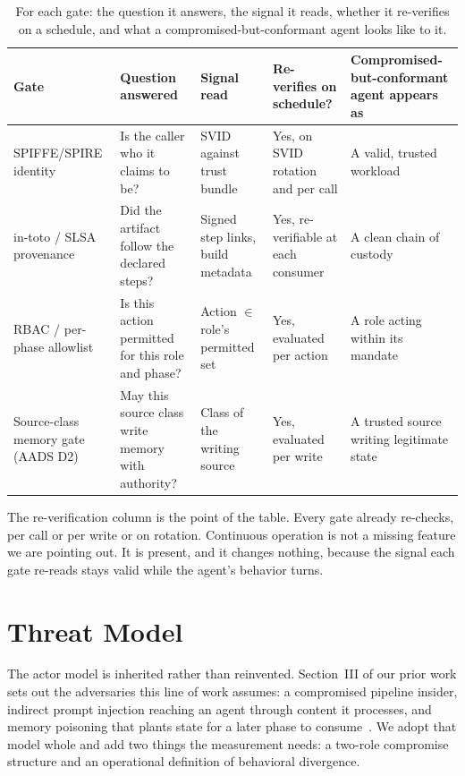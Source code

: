 \documentclass[conference]{IEEEtran}
\begin{document}
\begin{table}[t]
\caption{For each gate: the question it answers, the signal it reads, whether it re-verifies on a schedule, and what a compromised-but-conformant agent looks like to it.}
\label{tab:gates}
\centering
\renewcommand{\arraystretch}{1.15}
\footnotesize
\begin{tabularx}{\textwidth}{|L{2.6cm}|Y|Y|C{2.0cm}|Y|}
\hline
\textbf{Gate} & \textbf{Question answered} & \textbf{Signal read} & \textbf{Re-verifies on schedule?} & \textbf{Compromised-but-conformant agent appears as} \\
\hline
SPIFFE/SPIRE identity & Is the caller who it claims to be? & SVID against trust bundle & Yes, on SVID rotation and per call & A valid, trusted workload \\ \hline
in-toto / SLSA provenance & Did the artifact follow the declared steps? & Signed step links, build metadata & Yes, re-verifiable at each consumer & A clean chain of custody \\ \hline
RBAC / per-phase allowlist & Is this action permitted for this role and phase? & Action $\in$ role's permitted set & Yes, evaluated per action & A role acting within its mandate \\ \hline
Source-class memory gate (AADS D2) & May this source class write memory with authority? & Class of the writing source & Yes, evaluated per write & A trusted source writing legitimate state \\ \hline
\end{tabularx}
\end{table}

The re-verification column is the point of the table. Every gate already re-checks, per call or per write or on rotation. Continuous operation is not a missing feature we are pointing out. It is present, and it changes nothing, because the signal each gate re-reads stays valid while the agent's behavior turns.

\section{Threat Model}\label{sec:threat}

The actor model is inherited rather than reinvented. Section~III of our prior work sets out the adversaries this line of work assumes: a compromised pipeline insider, indirect prompt injection reaching an agent through content it processes, and memory poisoning that plants state for a later phase to consume~\cite{conf00}. We adopt that model whole and add two things the measurement needs: a two-role compromise structure and an operational definition of behavioral divergence.
\end{document}
